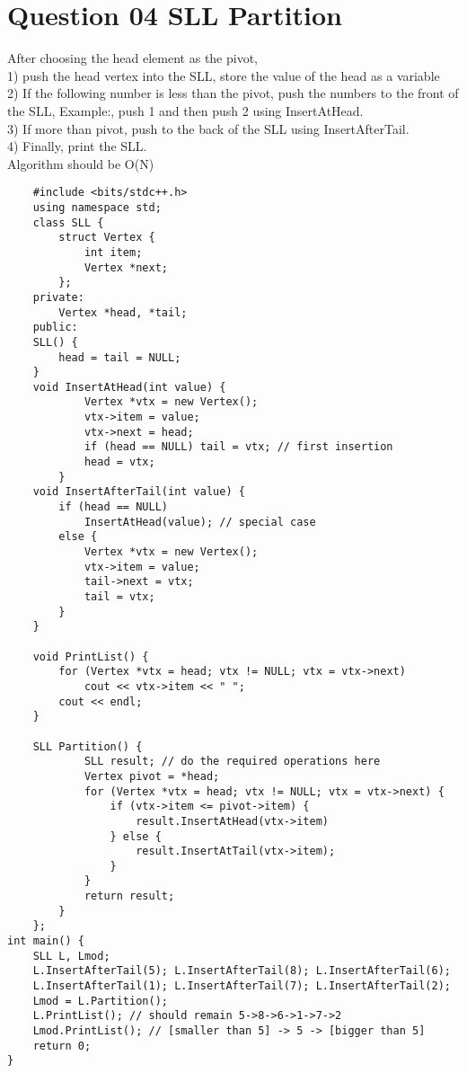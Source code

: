 \documentclass{article}
\begin{document}
\section{Question 04 SLL Partition}
\begin{enumerate}[label=(\arabic*)]

After choosing the head element as the pivot, 
\\
1) push the head vertex into the SLL, store the value of the head as a variable
\\
2) If the following number is less than the pivot, push the numbers to the front of the SLL, Example:, push 1 and then push 2 using InsertAtHead.
\\
3) If more than pivot, push to the back of the SLL using InsertAfterTail.
\\
4) Finally, print the SLL.
\\
Algorithm should be O(N)

\begin{verbatim}
    #include <bits/stdc++.h>
    using namespace std;
    class SLL {
        struct Vertex {
            int item;
            Vertex *next;
        };
    private:
        Vertex *head, *tail;
    public:
    SLL() {
        head = tail = NULL;
    }
    void InsertAtHead(int value) {
            Vertex *vtx = new Vertex();
            vtx->item = value;
            vtx->next = head;
            if (head == NULL) tail = vtx; // first insertion
            head = vtx;
        }
    void InsertAfterTail(int value) {
        if (head == NULL)
            InsertAtHead(value); // special case
        else {
            Vertex *vtx = new Vertex();
            vtx->item = value;
            tail->next = vtx;
            tail = vtx;
        }
    }
    
    void PrintList() {
        for (Vertex *vtx = head; vtx != NULL; vtx = vtx->next)
            cout << vtx->item << " ";
        cout << endl;
    }
    
    SLL Partition() {
            SLL result; // do the required operations here
            Vertex pivot = *head;
            for (Vertex *vtx = head; vtx != NULL; vtx = vtx->next) {
                if (vtx->item <= pivot->item) {
                    result.InsertAtHead(vtx->item)
                } else {
                    result.InsertAtTail(vtx->item);
                }
            }
            return result;
        }
    };
int main() {
    SLL L, Lmod;
    L.InsertAfterTail(5); L.InsertAfterTail(8); L.InsertAfterTail(6);
    L.InsertAfterTail(1); L.InsertAfterTail(7); L.InsertAfterTail(2);
    Lmod = L.Partition();
    L.PrintList(); // should remain 5->8->6->1->7->2
    Lmod.PrintList(); // [smaller than 5] -> 5 -> [bigger than 5]
    return 0;
}
\end{verbatim}

\end{enumerate}
\end{document}
